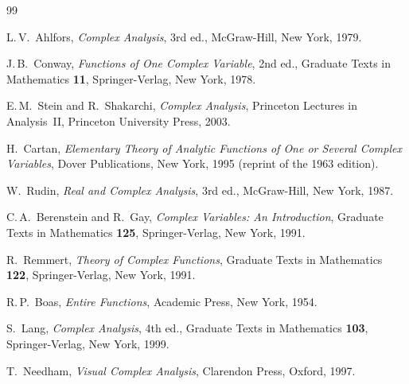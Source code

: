 \documentclass[12pt,a4paper,openany]{book}
\theoremstyle{definition}
\theoremstyle{plain}
\theoremstyle{remark}
\begin{document}
\begin{thebibliography}{99}

  L.\,V.\ Ahlfors,
  \emph{Complex Analysis},
  3rd ed., McGraw-Hill, New York, 1979.

  J.\,B.\ Conway,
  \emph{Functions of One Complex Variable},
  2nd ed., Graduate Texts in Mathematics \textbf{11}, Springer-Verlag,
  New York, 1978.

  E.\,M.\ Stein and R.\ Shakarchi,
  \emph{Complex Analysis},
  Princeton Lectures in Analysis~II, Princeton University Press, 2003.

  H.\ Cartan,
  \emph{Elementary Theory of Analytic Functions of One or Several
  Complex Variables},
  Dover Publications, New York, 1995 (reprint of the 1963 edition).

  W.\ Rudin,
  \emph{Real and Complex Analysis},
  3rd ed., McGraw-Hill, New York, 1987.

  C.\,A.\ Berenstein and R.\ Gay,
  \emph{Complex Variables: An Introduction},
  Graduate Texts in Mathematics \textbf{125}, Springer-Verlag,
  New York, 1991.

  R.\ Remmert,
  \emph{Theory of Complex Functions},
  Graduate Texts in Mathematics \textbf{122}, Springer-Verlag,
  New York, 1991.

  R.\,P.\ Boas,
  \emph{Entire Functions},
  Academic Press, New York, 1954.

  S.\ Lang,
  \emph{Complex Analysis},
  4th ed., Graduate Texts in Mathematics \textbf{103}, Springer-Verlag,
  New York, 1999.

  T.\ Needham,
  \emph{Visual Complex Analysis},
  Clarendon Press, Oxford, 1997.

\end{thebibliography}

\cleardoublepage
\printindex
\end{document}
